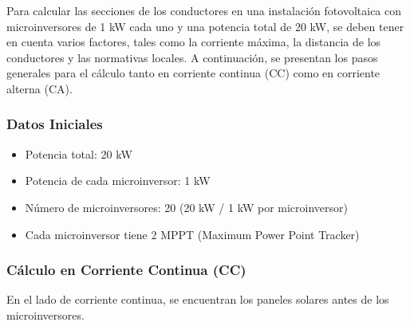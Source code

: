 \documentclass{article}
\begin{document}






Para calcular las secciones de los conductores en una instalación fotovoltaica con microinversores de 1 kW cada uno y una potencia total de 20 kW, se deben tener en cuenta varios factores, tales como la corriente máxima, la distancia de los conductores y las normativas locales. A continuación, se presentan los pasos generales para el cálculo tanto en corriente continua (CC) como en corriente alterna (CA).

\subsubsection{Datos Iniciales}
\begin{itemize}
    \item Potencia total: 20 kW
    \item Potencia de cada microinversor: 1 kW
    \item Número de microinversores: 20 (20 kW / 1 kW por microinversor)
    \item Cada microinversor tiene 2 MPPT (Maximum Power Point Tracker)
\end{itemize}

\subsubsection{Cálculo en Corriente Continua (CC)}

En el lado de corriente continua, se encuentran los paneles solares antes de los microinversores.
\end{document}
